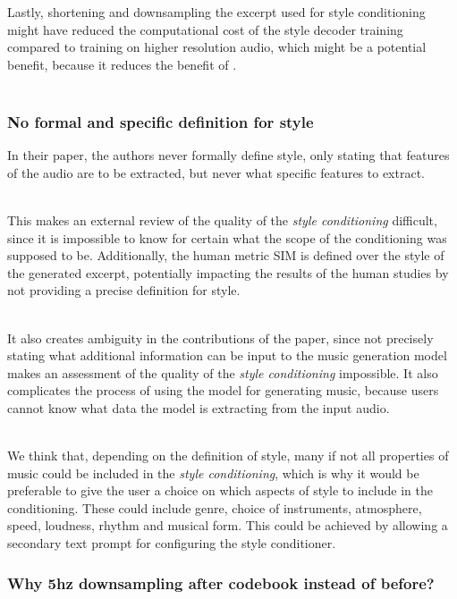 \documentclass[a4paper,12pt,twoside]{article}
\begin{document}
Lastly, shortening and downsampling the excerpt used for style conditioning might have reduced the computational cost of the style decoder training compared to training on higher resolution audio, which might be a potential benefit, because it reduces the benefit of . \\ \

\subsubsection{No formal and specific definition for style}\label{sec:style-def}

In their paper, the authors never formally define style, only stating that features of the audio are to be extracted, but never what specific features to extract. \\ \

This makes an external review of the quality of the \textit{style conditioning} difficult, since it is impossible to know for certain what the scope of the conditioning was supposed to be. Additionally, the human metric SIM is defined over the style of the generated excerpt, potentially impacting the results of the human studies by not providing a precise definition for style. \\ \

It also creates ambiguity in the contributions of the paper, since not precisely stating what additional information can be input to the music generation model makes an assessment of the quality of the \textit{style conditioning} impossible. It also complicates the process of using the model for generating music, because users cannot know what data the model is extracting from the input audio. \\ \


We think that, depending on the definition of style, many if not all properties of music could be included in the \textit{style conditioning}, which is why it would be preferable to give the user a choice on which aspects of style to include in the conditioning. These could include genre, choice of instruments, atmosphere, speed, loudness, rhythm and musical form. This could be achieved by allowing a secondary text prompt for configuring the style conditioner.

\subsubsection{Why 5hz downsampling after codebook instead of before?}
\end{document}
